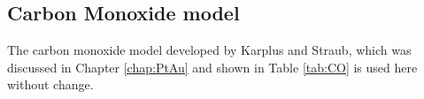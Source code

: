 %
%

\subsection{Carbon Monoxide model}
The carbon monoxide model developed by Karplus and Straub\citep{Straub:1991no},
which was discussed in Chapter \ref{chap:PtAu} and shown in Table \ref{tab:CO}
is used here without change.

